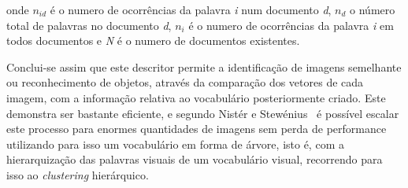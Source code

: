 onde $n_{id}$ é o numero de ocorrências da palavra \textit{i} num documento \textit{d}, $n_{d}$ o número total de palavras no documento \textit{d}, $n_{i}$ é o numero de ocorrências da palavra \textit{i} em todos documentos e \textit{N} é o numero de documentos existentes. 

Conclui-se assim que este descritor permite a identificação de imagens semelhante ou reconhecimento de objetos, através da comparação dos vetores de cada imagem, com a informação relativa ao vocabulário posteriormente criado. Este demonstra ser bastante eficiente, e segundo Nistér e Stewénius~\cite{Nister2006} é possível escalar este processo para enormes quantidades de imagens sem perda de performance utilizando para isso um vocabulário em forma de árvore, isto é, com a hierarquização das palavras visuais de um vocabulário visual, recorrendo para isso ao \textit{clustering} hierárquico.

%


